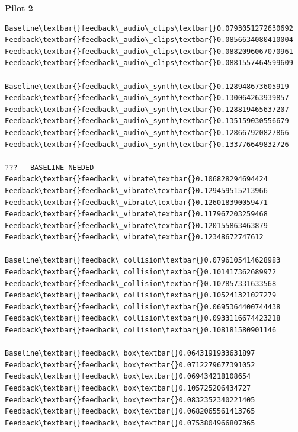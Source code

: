 \documentclass[a4paper,10pt,english,lof,lot,twoside]{puthesis}
\begin{document}
\textbf{Pilot 2}

\begin{Verbatim}[commandchars=\\\{\}]
Baseline\textbar{}feedback\_audio\_clips\textbar{}0.0793051272630692
Feedback\textbar{}feedback\_audio\_clips\textbar{}0.0856634080410004
Feedback\textbar{}feedback\_audio\_clips\textbar{}0.0882096067070961
Feedback\textbar{}feedback\_audio\_clips\textbar{}0.0881557464599609

Baseline\textbar{}feedback\_audio\_synth\textbar{}0.128948673605919
Feedback\textbar{}feedback\_audio\_synth\textbar{}0.130064263939857
Feedback\textbar{}feedback\_audio\_synth\textbar{}0.128819465637207
Feedback\textbar{}feedback\_audio\_synth\textbar{}0.135159030556679
Feedback\textbar{}feedback\_audio\_synth\textbar{}0.128667920827866
Feedback\textbar{}feedback\_audio\_synth\textbar{}0.133776649832726

??? - BASELINE NEEDED
Feedback\textbar{}feedback\_vibrate\textbar{}0.106828294694424
Feedback\textbar{}feedback\_vibrate\textbar{}0.129459515213966
Feedback\textbar{}feedback\_vibrate\textbar{}0.126018390059471
Feedback\textbar{}feedback\_vibrate\textbar{}0.117967203259468
Feedback\textbar{}feedback\_vibrate\textbar{}0.120155863463879
Feedback\textbar{}feedback\_vibrate\textbar{}0.12348672747612

Baseline\textbar{}feedback\_collision\textbar{}0.0796105414628983
Feedback\textbar{}feedback\_collision\textbar{}0.101417362689972
Feedback\textbar{}feedback\_collision\textbar{}0.107857331633568
Feedback\textbar{}feedback\_collision\textbar{}0.105241321027279
Feedback\textbar{}feedback\_collision\textbar{}0.0695364400744438
Feedback\textbar{}feedback\_collision\textbar{}0.0933116674423218
Feedback\textbar{}feedback\_collision\textbar{}0.108181580901146

Baseline\textbar{}feedback\_box\textbar{}0.0643191933631897
Feedback\textbar{}feedback\_box\textbar{}0.0712279677391052
Feedback\textbar{}feedback\_box\textbar{}0.069434218108654
Feedback\textbar{}feedback\_box\textbar{}0.105725206434727
Feedback\textbar{}feedback\_box\textbar{}0.0832352340221405
Feedback\textbar{}feedback\_box\textbar{}0.0682065561413765
Feedback\textbar{}feedback\_box\textbar{}0.0753804966807365
\end{Verbatim}





\renewcommand{\indexname}{Index}
\end{document}

